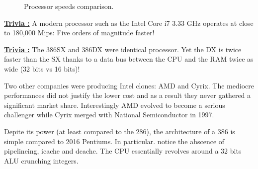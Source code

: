 \documentclass[book.tex]{subfiles}
\begin{document}
\begin{figure}[H]
\centering
   \caption{Processor speeds comparison.} \label{fig:mips}
 \end{figure}

 \textbf{\underline{Trivia :}} A modern processor such as the Intel Core i7 3.33 GHz operates at close to 180,000 Mips: Five orders of magnitude faster!

 \bigskip
 
 \textbf{\underline{Trivia :}} The 386SX and 386DX were identical processor. Yet the DX is twice faster than the SX thanks to a data bus between the CPU and the RAM twice as wide (32 bits vs 16 bits)!

\par

 Two other companies were producing Intel clones: AMD and Cyrix. The mediocre performances did not justify the lower cost and as a result they never gathered a significant market share. Interestingly AMD evolved to become a serious challenger while Cyrix merged with National Semiconductor in 1997.

Depite its power (at least compared to the 286), the architecture of a 386 is simple compared to 2016 Pentiums. In particular. notice the abscence of pipelineing, icache and dcache. The CPU essentially revolves around a 32 bits ALU crunching integers.
\end{document}
